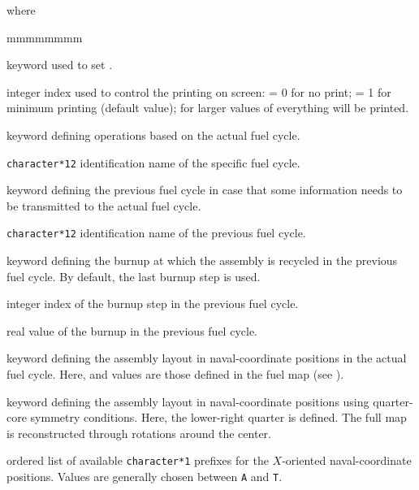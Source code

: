 \noindent where
\begin{ListeDeDescription}{mmmmmmmm}

\item[\moc{EDIT}] keyword used to set .

\item[\dusa{iprint}] integer index used to control the printing on screen:
 = 0 for no print; = 1 for minimum printing (default value); for larger values of
 everything will be printed.

\item[\moc{CYCLE}] keyword defining operations based on the actual fuel cycle.

\item[\dusa{hcnew}] \texttt{character*12} identification name of the specific fuel cycle.

\item[\moc{FROM}] keyword defining the previous fuel cycle in case that some information
needs to be transmitted to the actual fuel cycle.

\item[\dusa{hcold}] \texttt{character*12} identification name of the previous fuel cycle.

\item[\moc{BURN}] keyword defining the burnup at which the assembly is recycled in the previous fuel cycle. By default, the
last burnup step is used.

\item[\dusa{indcycle}] integer index of the burnup step in the previous fuel cycle.

\item[\dusa{burncycle}] real value of the burnup in the previous fuel cycle.

\item[\moc{MAP}] keyword defining the assembly layout in naval-coordinate positions in the
actual fuel cycle. Here,  and  values are those defined in the fuel map
(see ).

\item[\moc{QMAP}] keyword defining the assembly layout in naval-coordinate positions using
quarter-core symmetry conditions. Here, the lower-right quarter is defined.
The full map is reconstructed through rotations around the center.

\item[\dusa{hx}] ordered list of available \texttt{character*1} prefixes for the $X$-oriented
naval-coordinate positions. Values are generally chosen between {\tt A} and {\tt T}.


\end{ListeDeDescription}
